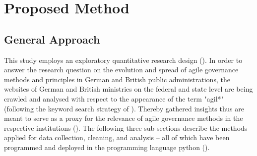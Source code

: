 








\section{Proposed Method}
\subsection{General Approach}
This study employs an exploratory quantitative research design (\cite{Olston2010, Jaeger1998}). In order to answer the research question on the evolution and spread of agile governance methods and principles in German and British public administrations, the websites of German and British ministries on the federal and state level are being crawled and analysed with respect to the appearance of the term "agil*" (following the keyword search strategy of \cite{Mergel2018}). Thereby gathered insights thus are meant to serve as a proxy for the relevance of agile governance methods in the respective institutions (\cite{Branco2006, Ghosh2013}). The following three sub-sections describe the methods applied for data collection, cleaning, and analysis – all of which have been programmed and deployed in the programming language python (\cite{VanRossum1995}).
%
